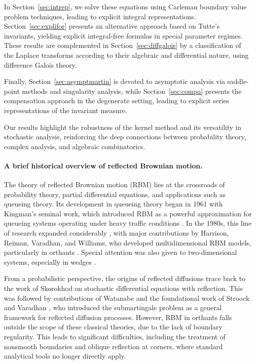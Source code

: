 \documentclass[11pt]{article}
\theoremstyle{definition}
\begin{document}
In Section~\ref{sec:intrep}, we solve these equations using Carleman boundary value problem techniques, leading to explicit integral representations. 
Section~\ref{sec:explifor} presents an alternative approach based on Tutte’s invariants, yielding explicit integral-free formulas in special parameter regimes. 
These results are complemented in Section~\ref{sec:diffgalois} by a classification of the Laplace transforms according to their algebraic and differential nature, using difference Galois theory.

Finally, Section~\ref{sec:asymptmartin} is devoted to asymptotic analysis via saddle-point methods and singularity analysis, while Section~\ref{sec:compa} presents the compensation approach in the degenerate setting, leading to explicit series representations of the invariant measure.

\medskip

Our results highlight the robustness of the kernel method and its versatility in stochastic analysis, reinforcing the deep connections between probability theory, complex analysis, and algebraic combinatorics.


\paragraph{A brief historical overview of reflected Brownian motion.}
The theory of reflected Brownian motion (RBM) lies at the crossroads of probability theory, partial differential equations, and applications such as queueing theory. Its development in queueing theory began in 1961 with Kingman’s seminal work, which introduced RBM as a powerful approximation for queueing systems operating under heavy traffic conditions \cite{Kingman1961}. In the 1980s, this line of research expanded considerably 
\cite{harrison_diffusion_1978,
harrison_brownian_1987,reiman_84_open}, with major contributions by Harrison, Reiman, Varadhan, and Williams, who developed multidimensional RBM models, particularly in orthants 
\cite{HaRe-81,
HaRe-81b,harrison_multidimensional_1987,reiman_boundary_1988}. Special attention was also given to two-dimensional systems, especially in wedges 
\cite{Williams-85,
williams_recurrence_1985,varadhan_brownian_1985}. 

From a probabilistic perspective, the origins of reflected diffusions trace back to the work of Skorokhod \cite{Skorokhod1961} on stochastic differential equations with reflection. This was followed by contributions of Watanabe \cite{watanabe1971} and the foundational work of Stroock and Varadhan \cite{Stroock1971}, who introduced the submartingale problem as a general framework for reflected diffusion processes. However, RBM in orthants falls outside the scope of these classical theories, due to the lack of boundary regularity. This leads to significant difficulties, including the treatment of nonsmooth boundaries and oblique reflection at corners, where standard analytical tools no longer directly apply.
\end{document}
